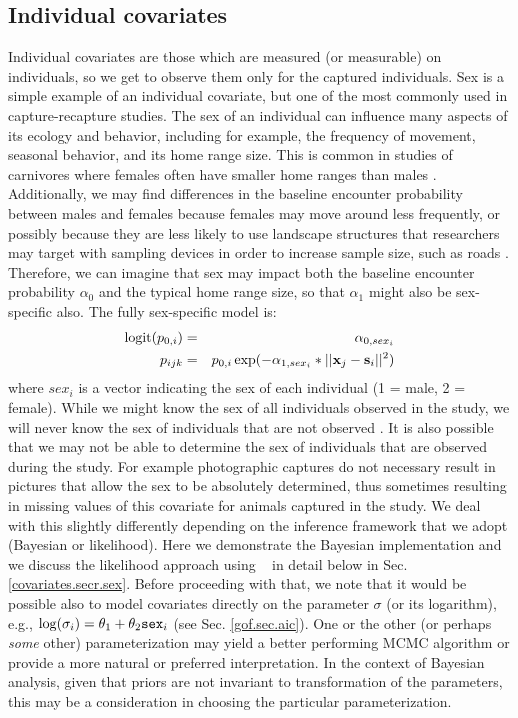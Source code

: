 \subsection{Individual covariates}
\label{covariates.sec.sex}


Individual covariates are those which are measured (or measurable) on
individuals, so we get to observe them only for the captured
individuals. Sex is a simple example of an individual covariate, but
one of the most commonly used in capture-recapture studies. 
The sex of an individual can influence many aspects of its ecology and
behavior, including for example, the frequency of
movement, seasonal behavior, and its home range size. This is common in studies of
carnivores where females often have smaller home ranges than males
\citep{gardner_etal:2010jwm, sollmann_etal:2011}. Additionally, we may
find differences in the baseline encounter probability
 between males and females
because females may move around less frequently, or possibly because
they are less likely to use landscape structures that researchers may
target with sampling devices in order to increase sample size, such as
roads \citep[e.g.][]{salom-perez_etal:2007}.
Therefore, 
we can imagine that sex may impact both the baseline encounter
probability $\alpha_{0}$ and the typical home range
size, so that
$\alpha_{1}$ might also be sex-specific also.  The fully sex-specific model is:
\begin{eqnarray*}
\mbox{logit}(p_{0,i}) &= &\alpha_{0,sex_{i}}  \\
p_{ijk} &= &p_{0,i} \exp(- \alpha_{1, sex_{i}}*||{\bf x}_{j}-{\bf s}_{i}||^2)
\end{eqnarray*}
where $sex_{i}$ is a vector indicating the sex of
each individual (1 = male, 2 = female).  While we might know the sex of all
individuals observed in the study, we will never know the
sex of individuals that are not observed \citep{gardner_etal:2010jwm}.
It is also possible that we may not be able to determine the sex of
individuals that are observed during the study. For example photographic
captures do not necessary result in pictures that allow the sex to be absolutely
determined, thus sometimes resulting in missing values of this covariate for animals
captured in the study.   We deal with this slightly differently
depending on the inference framework 
that we adopt (Bayesian or likelihood).  Here we demonstrate the Bayesian implementation 
and we discuss the likelihood approach using \secr~ in detail
below in Sec. \ref{covariates.secr.sex}.
Before proceeding with that, we note that it would be possible also to
model covariates directly on the parameter $\sigma$ (or its
logarithm), e.g., $\log(\sigma_{i}) = \theta_{1} + \theta_{2}
\mbox{\tt sex}_{i}$ (see Sec. \ref{gof.sec.aic}). 
One or the other (or perhaps {\it some} other)
parameterization may yield a better performing MCMC algorithm or provide a
more natural or preferred interpretation.
In the context of Bayesian analysis, given that priors are not
invariant to transformation of the parameters, this may be a
consideration in choosing the particular parameterization.


